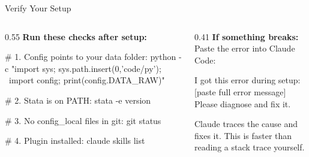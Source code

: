 \documentclass[aspectratio=169,11pt,dvipsnames]{beamer}
\begin{document}
\begin{frame}[fragile]{Verify Your Setup}
  \begin{columns}[T]
    \begin{column}{0.55\textwidth}
      \textbf{Run these checks after setup:}
      \begin{codebox}
\# 1. Config points to your data folder:
python -c "import sys; sys.path.insert(0,'code/py'); \
  import config; print(config.DATA_RAW)"

\# 2. Stata is on PATH:
stata -e version

\# 3. No config_local files in git:
git status

\# 4. Plugin installed:
claude skills list
      \end{codebox}
    \end{column}
    \begin{column}{0.41\textwidth}
      \textbf{If something breaks:}\\[0.3cm]
      Paste the error into Claude Code:
      \begin{codebox}
I got this error during setup:
[paste full error message]
Please diagnose and fix it.
      \end{codebox}
      \vspace{0.2cm}
      \begin{greenbox}
        \small Claude traces the cause and fixes it.
        This is faster than reading a stack trace yourself.
      \end{greenbox}
    \end{column}
  \end{columns}
\end{frame}
\end{document}
